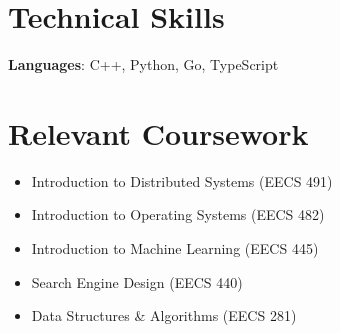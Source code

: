 \documentclass[letterpaper,11pt]{article}
\newcommand{\resumeItem}[1]{
  \item\small{
    {#1 \vspace{-2pt}}
  }
}
\newcommand{\resumeItemListStart}{\begin{itemize}}
\newcommand{\resumeItemListEnd}{\end{itemize}\vspace{-5pt}}
\begin{document}
%
\section{Technical Skills}
\begin{itemize}[leftmargin=0.15in, label={}]
  \small{\item{
                \textbf{Languages}{: C++, Python, Go, TypeScript}
          }}
\end{itemize}

%
\section{Relevant Coursework}
\resumeItemListStart{}
\resumeItem{Introduction to Distributed Systems (EECS 491)}
\resumeItem{Introduction to Operating Systems (EECS 482)}
\resumeItem{Introduction to Machine Learning (EECS 445)}
\resumeItem{Search Engine Design (EECS 440)}
\resumeItem{Data Structures \& Algorithms (EECS 281)}
\resumeItemListEnd{}


\end{document}

